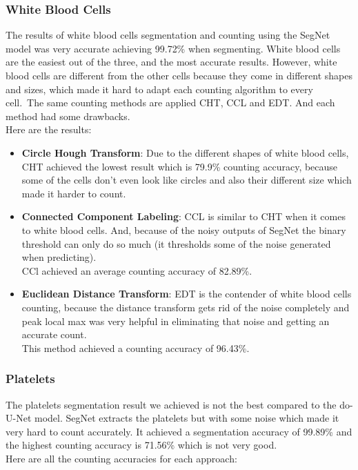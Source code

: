 \documentclass[conference]{IEEEtran}
\begin{document}
\subsubsection{White Blood Cells}
\hspace{\parindent}
The results of white blood cells segmentation and counting using the SegNet model was very accurate achieving 99.72\% when segmenting.
White blood cells are the easiest out of the three, and the most accurate results.
However, white blood cells are different from the other cells because they come in different shapes and sizes, which made it hard to adapt each counting algorithm to every cell.\
The same counting methods are applied CHT, CCL and EDT. And each method had some drawbacks.\\
Here are the results:

\begin{itemize}
  \item \textbf{Circle Hough Transform}: Due to the different shapes of white blood cells, CHT achieved the lowest result which is 79.9\% counting accuracy, because some of the cells don't even look like circles and also their different size which made it harder to count.
  \item \textbf{Connected Component Labeling}: CCL is similar to CHT when it comes to white blood cells. And, because of the noisy outputs of SegNet the binary threshold can only do so much (it thresholds some of the noise generated when predicting).\\
    CCl achieved an average counting accuracy of 82.89\%.
  \item \textbf{Euclidean Distance Transform}: EDT is the contender of white blood cells counting, because the distance transform gets rid of the noise completely and peak local max was very helpful in eliminating that noise and getting an accurate count.\\
    This method achieved a counting accuracy of 96.43\%.
\end{itemize}

\subsubsection{Platelets}
\hspace{\parindent}
The platelets segmentation result we achieved is not the best compared to the do-U-Net model. SegNet extracts the platelets but with some noise which made it very hard to count accurately.
It achieved a segmentation accuracy of 99.89\% and the highest counting accuracy is 71.56\% which is not very good.\\
Here are all the counting accuracies for each approach:
\end{document}
